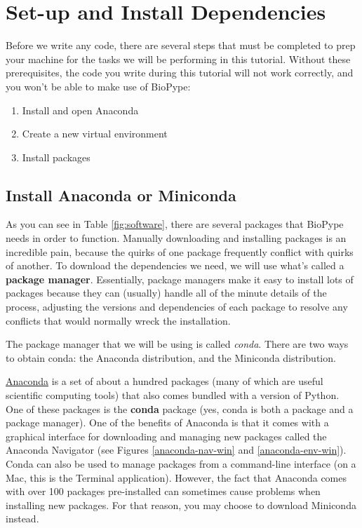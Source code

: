 %
\section{Set-up and Install Dependencies}
Before we write any code, there are several steps that must be completed to prep your machine for the tasks we will be performing in this tutorial. Without these prerequisites, the code you write during this tutorial will not work correctly, and you won't be able to make use of BioPype:
\begin{enumerate}
\item Install and open Anaconda
\item Create a new virtual environment
\item Install packages
\end{enumerate}

\subsection{Install Anaconda or Miniconda}
As you can see in Table \ref{fig:software}, there are several packages that BioPype needs in order to function. Manually downloading and installing packages is an incredible pain, because the quirks of one package frequently conflict with quirks of another. To download the dependencies we need, we will use what's called a \textbf{package manager}. Essentially, package managers make it easy to install lots of packages because they can (usually) handle all of the minute details of the process, adjusting the versions and dependencies of each package to resolve any conflicts that would normally wreck the installation.

The package manager that we will be using is called \textit{conda}. There are two ways to obtain conda: the Anaconda distribution, and the Miniconda distribution.

\ul{Anaconda} is a set of about a hundred packages (many of which are useful scientific computing tools) that also comes bundled with a version of Python. One of these packages is the \textbf{conda} package (yes, conda is both a package and a package manager). One of the benefits of Anaconda is that it comes with a graphical interface for downloading and managing new packages called the Anaconda Navigator (see Figures \ref{anaconda-nav-win} and \ref{anaconda-env-win}). Conda can also be used to manage packages from a command-line interface (on a Mac, this is the Terminal application). However, the fact that Anaconda comes with over 100 packages pre-installed can sometimes cause problems when installing new packages. For that reason, you may choose to download Miniconda instead.

